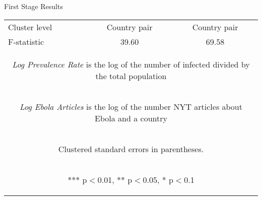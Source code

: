 \documentclass[11pt]{beamer}
\begin{document}
\begin{frame}{First Stage Results}
\begin{center}
\begin{table}[htbp]
{\begin{tabular}{lcc}
Cluster level & Country pair & Country pair \\
F-statistic & 39.60 & 69.58 \\ \hline
\multicolumn{3}{c}{\begin{footnotesize} \textit{Log Prevalence Rate} is the log of the number of infected divided by the total population \end{footnotesize} }\\
\multicolumn{3}{c}{\begin{footnotesize} \textit{Log Ebola Articles} is the log of the number NYT articles about Ebola and a country \end{footnotesize} }\\
\multicolumn{3}{c}{\begin{footnotesize} Clustered standard errors in parentheses. \end{footnotesize} }\\
\multicolumn{3}{c}{\begin{footnotesize} *** p$<$0.01, ** p$<$0.05, * p$<$0.1\end{footnotesize}} \\
\end{tabular}
}
\end{table}
\end{center}

\end{frame}
\end{document}
